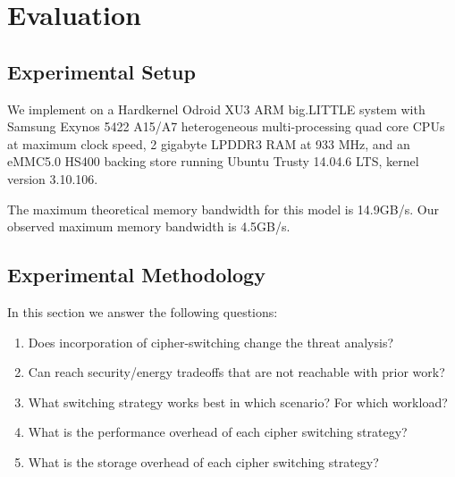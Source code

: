 \section{Evaluation}\label{sec:evaluation}


\subsection{Experimental Setup}

We implement \SYSTEM{} on a Hardkernel Odroid XU3 ARM big.LITTLE system with
Samsung Exynos 5422 A15/A7 heterogeneous multi-processing quad core CPUs at
maximum clock speed, 2 gigabyte LPDDR3 RAM at 933 MHz, and an eMMC5.0 HS400
backing store running Ubuntu Trusty 14.04.6 LTS, kernel version 3.10.106.

The maximum theoretical memory bandwidth for this model is 14.9GB/s\@.
Our observed maximum memory bandwidth is 4.5GB/s. 

\subsection{Experimental Methodology}
In this section we answer the following questions:
\begin{enumerate}
 \item Does incorporation of cipher-switching change the threat analysis? 
 \item Can \SYSTEM{} reach security/energy tradeoffs that are not reachable with prior work?
 \item What switching strategy works best in which scenario? For which workload?
 \item What is the performance overhead of each cipher switching strategy?
 \item What is the storage overhead of each cipher switching strategy?
\end{enumerate}


